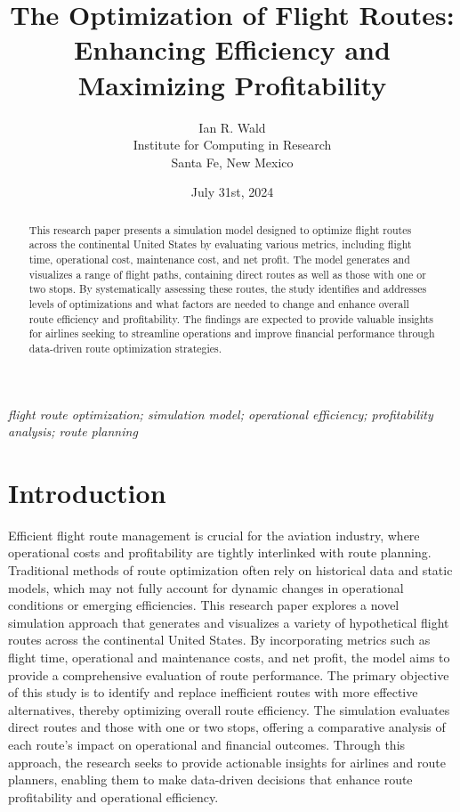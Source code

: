 \documentclass{article}
\title{The Optimization of Flight Routes: Enhancing Efficiency and Maximizing Profitability}
\author{Ian R. Wald\\
        \small Institute for Computing in Research\\
        \small Santa Fe, New Mexico}
\date{July 31st, 2024}
\begin{document}
\maketitle

\begin{abstract} 
\noindent This research paper presents a simulation model designed to optimize flight routes across the continental United States by evaluating various metrics, including flight time, operational cost, maintenance cost, and net profit. The model generates and visualizes a range of flight paths, containing direct routes as well as those with one or two stops. By systematically assessing these routes, the study identifies and addresses levels of optimizations and what factors are needed to change and enhance overall route efficiency and profitability. The findings are expected to provide valuable insights for airlines seeking to streamline operations and improve financial performance through data-driven route optimization strategies. \\
 \end{abstract}
\noindent\keywords\textit{flight route optimization; simulation model; operational efficiency;     
 profitability analysis; route planning}
 
\section{Introduction}

Efficient flight route management is crucial for the aviation industry, where operational costs and profitability are tightly interlinked with route planning. Traditional methods of route optimization often rely on historical data and static models, which may not fully account for dynamic changes in operational conditions or emerging efficiencies. This research paper explores a novel simulation approach that generates and visualizes a variety of hypothetical flight routes across the continental United States. By incorporating metrics such as flight time, operational and maintenance costs, and net profit, the model aims to provide a comprehensive evaluation of route performance.
The primary objective of this study is to identify and replace inefficient routes with more effective alternatives, thereby optimizing overall route efficiency. The simulation evaluates direct routes and those with one or two stops, offering a comparative analysis of each route’s impact on operational and financial outcomes. Through this approach, the research seeks to provide actionable insights for airlines and route planners, enabling them to make data-driven decisions that enhance route profitability and operational efficiency.
\end{document}
